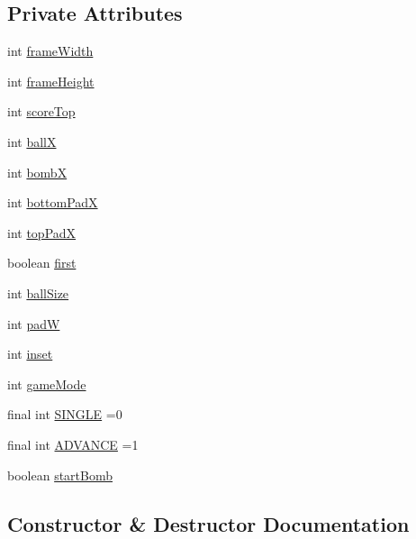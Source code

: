 \subsection*{Private Attributes}
\begin{DoxyCompactItemize}
\item 
int \hyperlink{classview_1_1_pong_game_display_aacbf5c26433ea74107021b461af657c1}{frame\+Width}
\item 
int \hyperlink{classview_1_1_pong_game_display_a1263ea81d63ff3e12b37fee42225a22e}{frame\+Height}
\item 
int \hyperlink{classview_1_1_pong_game_display_a14bdd6ada555582531723e7c11784251}{score\+Top}
\item 
int \hyperlink{classview_1_1_pong_game_display_aa1f518edcfa598a7ba036567eadf3ae0}{ballX}
\item 
int \hyperlink{classview_1_1_pong_game_display_ac37e1767ccd91ae204de6b0afc5aefaa}{bombX}
\item 
int \hyperlink{classview_1_1_pong_game_display_a195949e482e01530f0c8c876bbf88e6a}{bottom\+PadX}
\item 
int \hyperlink{classview_1_1_pong_game_display_a808ad12c167de880ca74e5ad56ea5f43}{top\+PadX}
\item 
boolean \hyperlink{classview_1_1_pong_game_display_aeb378cbf5a0a37e9105c9748910f3513}{first}
\item 
int \hyperlink{classview_1_1_pong_game_display_ae26155e2cdf4f47b164377b7ee3ba3e4}{ball\+Size}
\item 
int \hyperlink{classview_1_1_pong_game_display_a9617cc99b5e08dc62ac3272a0934d576}{padW}
\item 
int \hyperlink{classview_1_1_pong_game_display_ac202bb5082c22fb3f40ddff2ccc797b5}{inset}
\item 
int \hyperlink{classview_1_1_pong_game_display_a38f4635d73ef3c3986ad8a351b6f7a69}{game\+Mode}
\item 
final int \hyperlink{classview_1_1_pong_game_display_a8d4dbbd4e9ba52b12ba951899c7fe02d}{S\+I\+N\+G\+LE} =0
\item 
final int \hyperlink{classview_1_1_pong_game_display_a3aa7541f41ee227f6f7c3acf0bd35871}{A\+D\+V\+A\+N\+CE} =1
\item 
boolean \hyperlink{classview_1_1_pong_game_display_a4acf14f2571c372dd4737fac2b8d7412}{start\+Bomb}
\end{DoxyCompactItemize}


\subsection{Constructor \& Destructor Documentation}
\hypertarget{classview_1_1_pong_game_display_a1d578a032b81c4025ba91e6366672e07}{}\label{classview_1_1_pong_game_display_a1d578a032b81c4025ba91e6366672e07} 
